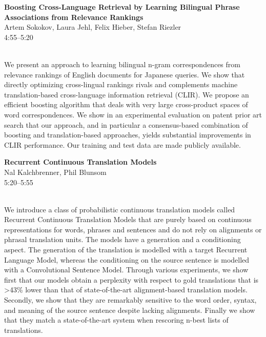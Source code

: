 \documentclass[twoside,makeidx]{book}
\begin{document}
\par\vspace{2em}\noindent%
\begin{minipage}{\linewidth}%
\begin{center}
\textbf{\normalsize Boosting Cross-Language Retrieval by Learning Bilingual Phrase Associations from Relevance Rankings}\\
\normalsize  Artem Sokokov,  Laura Jehl,  Felix Hieber,  Stefan Riezler\\
{\small 4:55--5:20}\\
\end{center}
\end{minipage}\\[0.5em]
\nopagebreak%
\noindent%
{\small We present an approach to learning bilingual n-gram correspondences from relevance rankings of English documents for Japanese queries. We show that directly optimizing cross-lingual rankings rivals and complements machine translation-based cross-language information retrieval (CLIR). We propose an efficient boosting algorithm that deals with very large cross-product spaces of word correspondences. We show in an experimental evaluation on patent prior art search that our approach, and in particular a consensus-based combination of boosting and translation-based approaches, yields substantial improvements in CLIR performance. Our training and test data are made publicly available.}
\par\vspace{2em}\noindent%
\begin{minipage}{\linewidth}%
\begin{center}
\textbf{\normalsize Recurrent Continuous Translation Models}\\
\normalsize  Nal Kalchbrenner,  Phil Blunsom\\
{\small 5:20--5:55}\\
\end{center}
\end{minipage}\\[0.5em]
\nopagebreak%
\noindent%
{\small We introduce a class of probabilistic continuous translation models called Recurrent Continuous Translation Models that are purely based on continuous representations for words, phrases and sentences and do not rely on alignments or phrasal translation units. The models have a generation and a conditioning aspect. The generation of the translation is modelled with a target Recurrent Language Model, whereas the conditioning on the source sentence is modelled with a Convolutional Sentence Model.  Through various experiments, we show first that our models obtain a perplexity with respect to gold translations that is >43\% lower than that of state-of-the-art alignment-based translation models. Secondly, we show that they are remarkably sensitive to the word order, syntax, and meaning of the source sentence despite lacking alignments.  Finally we show that they match a state-of-the-art system when rescoring n-best lists of translations.}
\clearpage
\end{document}
